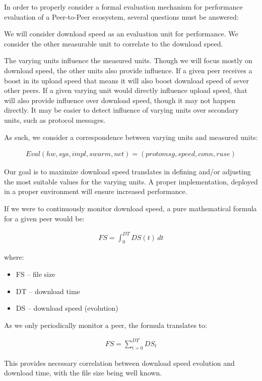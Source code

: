 In order to properly consider a formal evaluation mechanism for performance
evaluation of a Peer-to-Peer ecosystem, several questions must be answered:

We will consider download speed
as an evaluation unit for performance. We consider the other measurable unit
to correlate to the download speed.

The varying units influence the measured units. Though we will focus mostly on
download speed, the other units also provide influence. If a given peer
receives a boost in its upload speed that means it will also boost download
speed of sever other peers. If a given varying unit would directly influence
upload speed, that will also provide influence over download speed, though it
may not happen directly. It may be easier to detect influence of varying units
over secondary units, such as protocol messages.

As such, we consider a correspondence between varying units and measured
units:

\begin{align}
\label{eq:proto-measure:eval}
Eval(hw, sys, impl, swarm, net) = (protomsg, speed, conn, ruse)
\end{align}

Our goal is to maximize download speed translates in defining and/or adjusting
the most suitable values for the varying units. A proper implementation,
deployed in a proper environment will ensure increased performance.

If we were to continuously monitor download speed, a pure mathematical formula
for a given peer would be:

\begin{align}
  FS = \int_0^{DT} DS(t)\,dt
\end{align}

where:

\begin{itemize}
  \item FS -- file size
  \item DT -- download time
  \item DS -- download speed (evolution)
\end{itemize}

As we only periodically monitor a peer, the formula translates to:

\begin{align}
  FS = \sum_{t=0}^{DT} DS_{t}
\end{align}

This provides necessary correlation between download speed evolution and
download time, with the file size being well known.

